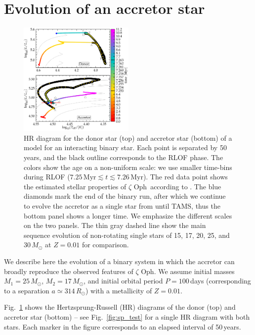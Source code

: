 \documentclass[twocolumn,twocolappendix,trackchanges]{aastex63}
\DeclareRobustCommand{\Figref}[1]{Fig.~\ref{#1}}
\newcommand{\zoph}{$\zeta$ Oph}
\begin{document}
\section{Evolution of an accretor star}
\label{sec:best_model}

\begin{figure}[htbp]
  \includegraphics[width=0.5\textwidth]{HRD_colored}
  \caption{HR diagram for the donor star (top) and accretor star
    (bottom) of a model for an interacting binary star. Each point is
    separated by 50\,years, and the black outline corresponds to the
    RLOF phase. The colors show the age on a non-uniform scale: we use
    smaller time-bins during RLOF
    ($7.25\,\mathrm{Myr}\lesssim t \lesssim 7.26\,\mathrm{Myr}$).  The
    red data point shows the estimated stellar properties of \zoph\ according to
    . The blue diamonds mark the end of
    the binary run, after which we continue to evolve the accretor as a single
    star from until TAMS, thus the bottom panel
    shows a longer time. We emphasize the different scales on the two
    panels. The thin gray dashed line show the main sequence evolution
    of non-rotating single stars of 15, 17, 20, 25, and 30\,$M_\odot$
    at $Z=0.01$ for comparison.}
  \label{fig:HRD_both}
\end{figure}


We describe here the evolution of a binary system in which the
accretor can broadly reproduce the observed features of \zoph. We
assume initial masses $M_1=25\,M_\odot$, $M_2=17\,M_\odot$, and initial orbital
period $P=100$\,days (corresponding to a separation
$a\simeq314\,R_\odot$) with a metallicity of $Z=0.01$.

\Figref{fig:HRD_both} shows the Hertzsprung-Russell (HR) diagrams of
the donor (top) and accretor star (bottom) -- see \Figref{fig:sp_test} for a single HR
diagram with both stars. Each marker in the figure
corresponds to an elapsed interval of 50\,years.
\end{document}
